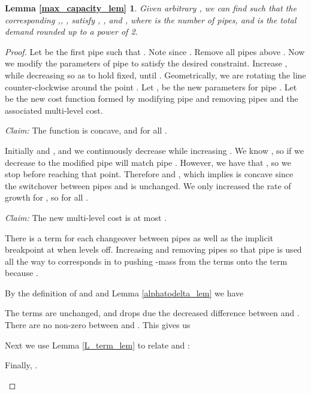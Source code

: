 \documentclass[11pt]{article}
\begin{document}
\newtheorem*{thm_max_capacity}{Lemma \ref{max_capacity_lem}}

\begin{thm_max_capacity} 
Given arbitrary , we can find  such that the corresponding ,, ,  satisfy , , and , where  is the number of pipes, and  is the total demand rounded up to a power of 2.
\end{thm_max_capacity}

\begin{proof}
Let  be the first pipe such that .  Note  since .  Remove all pipes above .  
Now we modify the parameters of pipe  to satisfy the desired constraint.
Increase , while decreasing  so as to hold  fixed, until .  Geometrically, we are rotating the line  counter-clockwise around the point .  Let ,  be the new parameters for pipe .  Let  be the new cost function formed by modifying pipe  and removing pipes  and  the associated multi-level cost.

\begin{description}
\item{\emph{Claim:}}
The function  is concave, and  for all .

Initially  and , and we continuously decrease  while increasing .  We know , so if we decrease  to  the modified pipe  will match pipe .  However, we have that , so we stop before reaching that point.  Therefore  and , which implies  is concave since the switchover between pipes  and  is unchanged.
We only increased the rate of growth for , so  for all .


\item{\emph{Claim:}} The new multi-level cost  is at most .

There is a term  for each changeover between pipes as well as the implicit breakpoint at  when  levels off.
Increasing  and removing pipes  so that pipe  is used all the way to  corresponds in  to pushing -mass from the terms  onto the term  because .  

By the definition of  and  and Lemma \ref{alphatodelta_lem} we have 

The terms  are unchanged, and  drops due the decreased difference between  and .  There are no non-zero  between  and .  This gives us 


Next we use Lemma \ref{L_term_lem} to relate  and :

Finally, .
\end{description}
\end{proof}

\newtheorem*{thm_delta}{Lemma \ref{delta_lem}}
\end{document}

